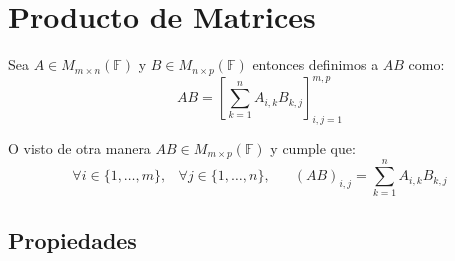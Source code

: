 \documentclass[12pt, fleqn]{report}                             %
\DeclareMathOperator \Space {\quad}                             %
\DeclareMathOperator \MiniSpace {\;}                            %
\newcommand{\Brackets}[1]{\left[ #1 \right]}                    %
\begin{document}
        \clearpage
        \section{Producto de Matrices}

            Sea $A \in M_{m \times n}(\mathbb{F})$ y $B \in M_{n \times p}(\mathbb{F})$ entonces 
            definimos a $AB$ como:
            \begin{equation}
                AB = \Brackets{\sum_{k=1}^{n} A_{i, k}B_{k, j} }_{i, j = 1}^{m, p}
            \end{equation}

            O visto de otra manera $AB \in M_{m \times p}(\mathbb{F})$ y cumple que:
            \begin{equation}
                \forall i \in \{1, \dots, m\} ,\MiniSpace
                    \forall j \in \{1, \dots, n\} ,\Space
                        (AB)_{i, j} = \sum_{k=1}^{n} A_{i, k}B_{k, j}
            \end{equation}


            \clearpage
            \subsection{Propiedades}
\end{document}
